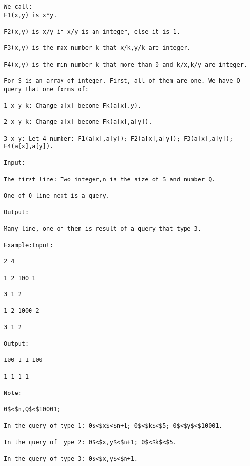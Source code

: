 
\begin{verbatim}
We call:
F1(x,y) is x*y.

F2(x,y) is x/y if x/y is an integer, else it is 1.

F3(x,y) is the max number k that x/k,y/k are integer.

F4(x,y) is the min number k that more than 0 and k/x,k/y are integer.

For S is an array of integer. First, all of them are one. We have Q query that one forms of:

1 x y k: Change a[x] become Fk(a[x],y).

2 x y k: Change a[x] become Fk(a[x],a[y]).

3 x y: Let 4 number: F1(a[x],a[y]); F2(a[x],a[y]); F3(a[x],a[y]); F4(a[x],a[y]).

Input:

The first line: Two integer,n is the size of S and number Q.

One of Q line next is a query.

Output:

Many line, one of them is result of a query that type 3.

Example:Input:

2 4

1 2 100 1

3 1 2

1 2 1000 2

3 1 2

Output:

100 1 1 100

1 1 1 1

Note:

0$<$n,Q$<$10001;

In the query of type 1: 0$<$x$<$n+1; 0$<$k$<$5; 0$<$y$<$10001.

In the query of type 2: 0$<$x,y$<$n+1; 0$<$k$<$5.

In the query of type 3: 0$<$x,y$<$n+1.\end{verbatim}
